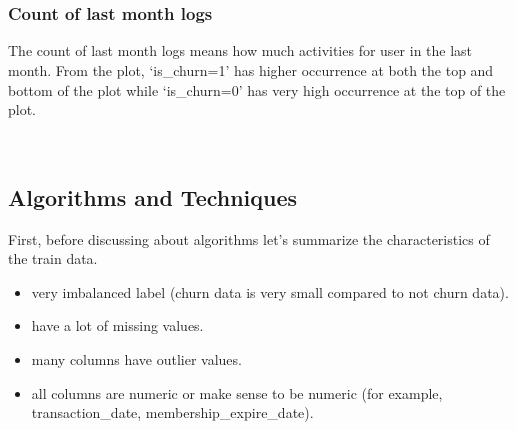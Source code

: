 \documentclass[11pt]{article}
\begin{document}
    \begin{center}
    \end{center}
    { \hspace*{\fill} \\}
    
    \begin{center}
    \end{center}
    { \hspace*{\fill} \\}
    
    \subsubsection{Count of last month logs}\label{count-of-last-month-logs}

The count of last month logs means how much activities for user in the
last month. From the plot, `is\_churn=1' has higher occurrence at both
the top and bottom of the plot while `is\_churn=0' has very high
occurrence at the top of the plot.

    \begin{center}
    \end{center}
    { \hspace*{\fill} \\}
    
    \subsection{Algorithms and Techniques}\label{algorithms-and-techniques}

First, before discussing about algorithms let's summarize the
characteristics of the train data.

\begin{itemize}
\itemsep1pt\parskip0pt
\item
  very imbalanced label (churn data is very small compared to not churn
  data).
\item
  have a lot of missing values.
\item
  many columns have outlier values.
\item
  all columns are numeric or make sense to be numeric (for example,
  transaction\_date, membership\_expire\_date).
\end{itemize}
\end{document}
